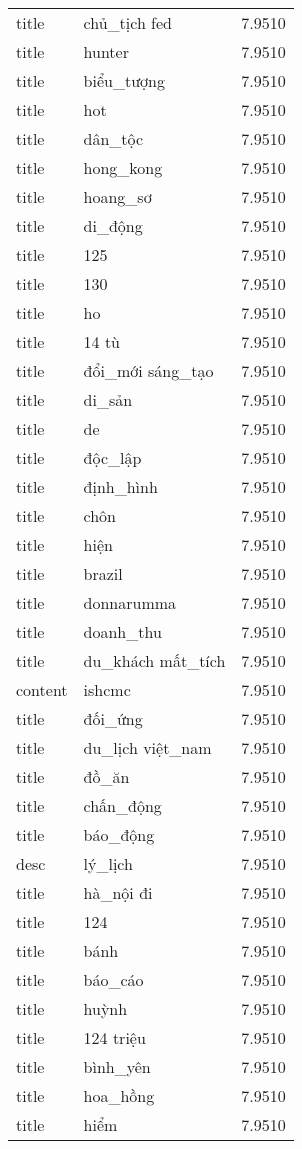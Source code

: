 \documentclass{article}
\begin{document}
\begin{tabular}{lll}
title & chủ\_tịch fed & 7.9510\\
title & hunter & 7.9510\\
title & biểu\_tượng & 7.9510\\
title & hot & 7.9510\\
title & dân\_tộc & 7.9510\\
title & hong\_kong & 7.9510\\
title & hoang\_sơ & 7.9510\\
title & di\_động & 7.9510\\
title & 125 & 7.9510\\
title & 130 & 7.9510\\
title & ho & 7.9510\\
title & 14 tù & 7.9510\\
title & đổi\_mới sáng\_tạo & 7.9510\\
title & di\_sản & 7.9510\\
title & de & 7.9510\\
title & độc\_lập & 7.9510\\
title & định\_hình & 7.9510\\
title & chôn & 7.9510\\
title & hiện & 7.9510\\
title & brazil & 7.9510\\
title & donnarumma & 7.9510\\
title & doanh\_thu & 7.9510\\
title & du\_khách mất\_tích & 7.9510\\
content & ishcmc & 7.9510\\
title & đối\_ứng & 7.9510\\
title & du\_lịch việt\_nam & 7.9510\\
title & đồ\_ăn & 7.9510\\
title & chấn\_động & 7.9510\\
title & báo\_động & 7.9510\\
desc & lý\_lịch & 7.9510\\
title & hà\_nội đi & 7.9510\\
title & 124 & 7.9510\\
title & bánh & 7.9510\\
title & báo\_cáo & 7.9510\\
title & huỳnh & 7.9510\\
title & 124 triệu & 7.9510\\
title & bình\_yên & 7.9510\\
title & hoa\_hồng & 7.9510\\
title & hiểm & 7.9510\\

\end{tabular}
\end{document}
